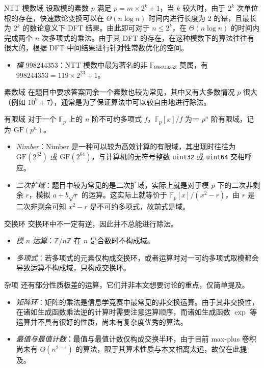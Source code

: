\begin{asparadesc}
\item [NTT 模数域] 设取模的素数 $p$ 满足 $p= m\times 2^k+1$，当 $k$ 较大时，由于 $2^k$ 次单位根的存在，快速数论变换可以在 $\Theta(n\log n)$ 时间内进行长度为 $2$ 的幂，且最长为 $2^k$ 的数论意义下 DFT 结果。由此即可对于 $n\le 2^k$，在 $\Theta(n\log n)$ 的时间内完成两个 $n$ 次多项式的乘法。由于其 DFT 的存在，在这种模数下的算法往往有很大的，根据 DFT 中间结果进行针对性常数优化的空间。

\begin{itemize}
\item \emph{模 $998244353$}：NTT 模数中最为著名的非 $\mathbb F_{998244353}$ 莫属，有 $998244353 = 119\times 2^{23} + 1$。
\end{itemize}

\item [素数域] 在题目中要求答案同余一个素数也较为常见，其中又有大多数情况 $p$ 很大（例如 $10^9+7$），通常是为了保证算法中可以较自由地进行除法。

\item [有限域] 对于一个 $\mathbb F_p$ 上的 $n$ 阶不可约多项式 $f$，$\mathbb F_p[x]/f$ 为一 $p^n$ 阶有限域，记为 $\mathrm{GF}(p^n)$。

\begin{itemize}
\item \emph{Nimber}：Nimber 是一种可以较为高效计算的有限域，其出现时往往为 $\mathrm{GF}(2^{32})$ 或 $\mathrm{GF}(2^{64})$，与计算机的无符号整数 \texttt{uint32} 或 \texttt{uint64} 交相呼应。
\item \emph{二次扩域}：题目中较为常见的是二次扩域，实际上就是对于模 $p$ 下的二次非剩余 $r$，模拟 $a + b\sqrt r$ 的运算。这实际上就等价于 $\mathbb F_p[x]/(x^2-r)$，由 $r$ 是二次非剩余可知 $x^2-r$ 是不可约多项式，故前式是域。
\end{itemize}

\item [交换环] 交换环中不一定有逆，因此并不总能进行除法。

\begin{itemize}
\item \emph{模 $n$ 运算}：$\mathbb Z/n\mathbb Z$ 在 $n$ 是合数时不构成域。
\item \emph{多项式}：若多项式的元素仅构成交换环，或者运算时对一可约多项式取模都会导致运算不构成域，只构成交换环。
\end{itemize}

\item [杂项] 还有部分性质极差的运算，它们并非本文想要讨论的重点，仅简单提及。

\begin{itemize}
\item \emph{矩阵环}：矩阵的乘法是信息学竞赛中最常见的非交换运算。由于其非交换性，在诸如生成函数乘法逆的计算时需要注意运算顺序，而诸如生成函数 $\exp$ 等运算并不具有很好的性质，尚未有复杂度优秀的算法。
\item \emph{最值与最值计数}：最值与最值计数仅构成交换半环，由于目前 max-plus 卷积尚未有 $O(n^{2-\epsilon})$ 的算法，限于其算术性质与本文相离太远，故仅在此提及。
\end{itemize}

\end{asparadesc}

